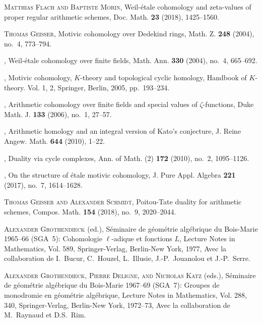 \documentclass[leqno,12pt]{article}
\theoremstyle{plain}
\theoremstyle{definition}
\begin{document}
\begin{thebibliography}{99}
  \textsc{Matthias Flach and Baptiste Morin}, Weil-\'{e}tale cohomology and
  zeta-values of proper regular arithmetic schemes, Doc. Math. \textbf{23}
  (2018), 1425--1560.

  \textsc{Thomas Geisser}, Motivic cohomology over {D}edekind rings, Math. Z.
  \textbf{248} (2004), no.~4, 773--794.

  \bysame, Weil-\'{e}tale cohomology over finite fields, Math. Ann.
  \textbf{330} (2004), no.~4, 665--692.

  \bysame, Motivic cohomology, {$K$}-theory and topological cyclic
  homology, Handbook of {$K$}-theory. {V}ol. 1, 2, Springer, Berlin, 2005,
  pp.~193--234.

  \bysame, Arithmetic cohomology over finite fields and special values of
  {$\zeta$}-functions, Duke Math. J. \textbf{133} (2006), no.~1, 27--57.

  \bysame, Arithmetic homology and an integral version of {K}ato's
  conjecture, J. Reine Angew. Math. \textbf{644} (2010), 1--22.

  \bysame, Duality via cycle complexes, Ann. of Math. (2) \textbf{172}
  (2010), no.~2, 1095--1126.

  \bysame, On the structure of \'{e}tale motivic cohomology, J. Pure Appl.
  Algebra \textbf{221} (2017), no.~7, 1614--1628.

  \textsc{Thomas Geisser and Alexander Schmidt}, Poitou-{T}ate duality for
  arithmetic schemes, Compos. Math. \textbf{154} (2018), no.~9, 2020--2044.

  \textsc{Alexander Grothendieck} (ed.), S{\'e}minaire de g{\'e}om{\'e}trie
  alg{\'e}brique du {B}ois-{M}arie 1965--66 ({SGA}~5): {C}ohomologie
  $\ell$-adique et fonctions {$L$}, Lecture Notes in Mathematics, Vol. 589,
  Springer-Verlag, Berlin-New York, 1977, Avec la collaboration de I.~Bucur,
  C.~Houzel, L.~Illusie, J.-P.~Jouanolou et J.-P.~Serre.

  \textsc{Alexander Grothendieck, Pierre Deligne, and Nicholas Katz} (eds.),
  S{\'e}minaire de g{\'e}om{\'e}trie alg{\'e}brique du {B}ois-{M}arie
  1967--69 ({SGA}~7): Groupes de monodromie en g\'eom\'etrie alg\'ebrique,
  Lecture Notes in Mathematics, Vol. 288, 340, Springer-Verlag, Berlin-New
  York, 1972--73, Avec la collaboration de {M}.~{R}aynaud et {D}.{S}.~{R}im.


\end{thebibliography}
\end{document}
